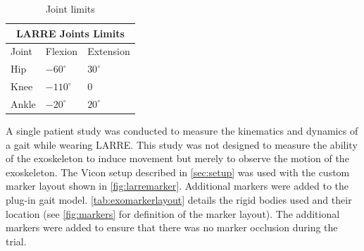 \begin{table}[h!]
\begin{centering}
    \begin{tabular}{ |p{1cm} p{2cm} p{2cm} |  }
        \hline 
        \multicolumn{3}{|c|}{LARRE Joints Limits} \\
        \hline 
        Joint & Flexion & Extension \\
        \hline \hline
        Hip   & $-60^{\circ}$   & $30^{\circ}$  \\
        Knee &   $-110^{\circ}$  & $0$   \\
        Ankle & $-20^{\circ}$ & $20^{\circ}$  \\
        \hline
    \end{tabular}
    \caption[LARRE Joint Limits]{Joint limits}    \centering
    \label{tab:jointlimits}
\end{centering}
\end{table}


A single patient study was conducted to measure the kinematics and dynamics of a gait while wearing LARRE. This study was not designed to measure the ability of the exoskeleton to induce movement but merely to observe the motion of the exoskeleton. The Vicon setup described in \autoref{sec:setup} was used with the custom marker layout shown in \autoref{fig:larremarker}. Additional markers were added to the plug-in gait model. \autoref{tab:exomarkerlayout} details the rigid bodies used and their location (see \autoref{fig:markers} for definition of the marker layout). The additional markers were added to ensure that there was no marker occlusion during the trial. 


